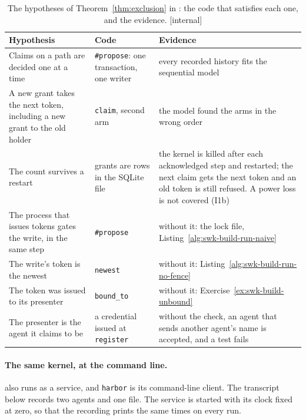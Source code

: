 \begin{table}[H]
\centering
\caption{The hypotheses of Theorem~\ref{thm:exclusion} in \pdkernelname{}:
the code that satisfies each one, and the evidence. [internal]}
\label{tab:swk-build-hypotheses}
\footnotesize
\renewcommand{\arraystretch}{1.2}
\begin{tabularx}{\textwidth}{@{}>{\raggedright\arraybackslash}p{} >{\raggedright\arraybackslash}p{} >{\raggedright\arraybackslash}X@{}}
\toprule
\textbf{Hypothesis} & \textbf{Code} & \textbf{Evidence} \\
\midrule
Claims on a path are decided one at a time & \texttt{\#propose}: one transaction, one writer & every recorded history fits the sequential model \\
A new grant takes the next token, including a new grant to the old holder & \texttt{claim}, second arm & the model found the arms in the wrong order \\
The count survives a restart & grants are rows in the SQLite file & the kernel is killed after each acknowledged step and restarted; the next claim gets the next token and an old token is still refused. A power loss is not covered (I1b) \\
The process that issues tokens gates the write, in the same step & \texttt{\#propose} & without it: the lock file, Listing~\ref{alg:swk-build-run-naive} \\
The write's token is the newest & \texttt{newest} & without it: Listing~\ref{alg:swk-build-run-no-fence} \\
The token was issued to its presenter & \texttt{bound\_to} & without it: Exercise~\ref{ex:swk-build-unbound} \\
The presenter is the agent it claims to be & a credential issued at \texttt{register} & without the check, an agent that sends another agent's name is accepted, and a test fails \\
\bottomrule
\end{tabularx}
\end{table}

\paragraph{The same kernel, at the command line.}
\pdkernelname{} also runs as a service, and \texttt{harbor} is its
command-line client. The transcript below records two agents and one file.
The service is started with its clock fixed at zero, so that the recording
prints the same times on every run.

